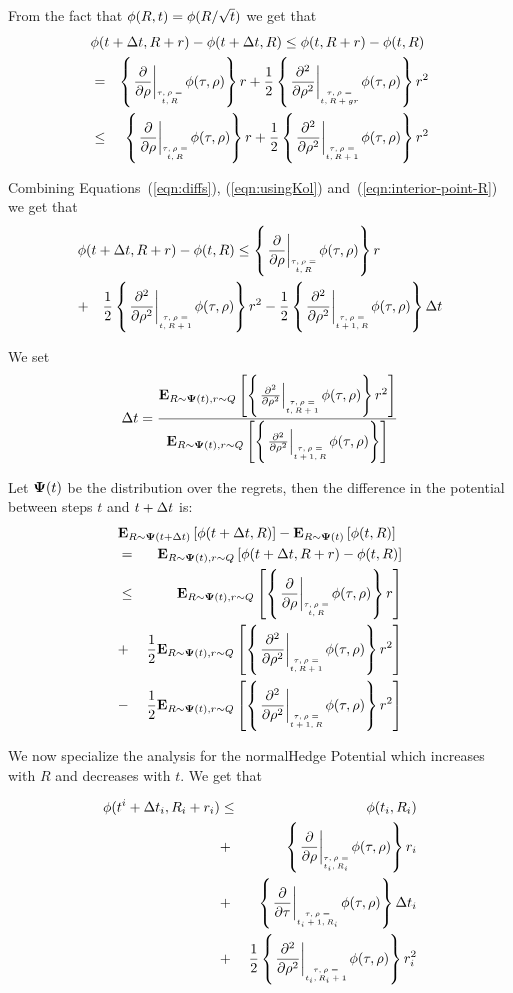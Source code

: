 \documentclass{article}[12pt]
\begin{document}
{From the fact that $\phi(R,t) = \phi(R/\sqrt{t})$ we get that 
\begin{eqnarray}
  \lefteqn{\pot(t+\deltat,\R+r)-\pot(t+\deltat,\R)
  \leq \pot(t,\R+r)-\pot(t,\R)}&&\\
  &=&\at{\frac{\partial}{\partial \rho}}{t,R} r
  +\frac{1}{2} \at{\frac{\partial^2}{\partial \rho^2}}{t,R+g r} r^2
  \nonumber \\
  &\leq& \at{\frac{\partial}{\partial \rho}}{t,R} r
  +\frac{1}{2} \at{\frac{\partial^2}{\partial \rho^2}}{t,R+1} r^2
  \label{eqn:interior-point-R}
\end{eqnarray}

Combining Equations~(\ref{eqn:diffs}), (\ref{eqn:usingKol}) and~(\ref{eqn:interior-point-R}) we get that
\begin{eqnarray} 
  \lefteqn{\pot(t+\deltat,\R+r) - \pot(t,\R)
   \leq  \at{\frac{\partial}{\partial \rho}}{t,R} r} &&\\
   &+&   \frac{1}{2} \at{\frac{\partial^2}{\partial \rho^2}}{t,R+1} r^2
   - \frac{1}{2} \at{\frac{\partial^2}{\partial \rho^2}}{t+1,R} \deltat
\end{eqnarray}

 We set
 \[
   \deltat  = \frac{\E{R \sim \state(t), r \sim Q}{\at{\frac{\partial^2}{\partial \rho^2}}{t,R+1}r^2}}
   {\E{R \sim \state(t), r \sim Q}{\at{\frac{\partial^2}{\partial \rho^2}}{t+1,R}}}
 \]

Let ${\bf \Psi}(t)$ be the distribution over the regrets, then the difference in the potential between steps $t$ and $t+\Delta t$ is:
\begin{eqnarray}
  \lefteqn{\E{\R \sim \state(t+\deltat)}{\pot(t+\deltat,\R)} -
  \E{\R \sim \state(t)}{\pot(t,\R)} }
  &&\\
  &=&
      \E{R \sim \state(t), r \sim Q}{\pot(t+\deltat,R+r) - \pot(t,\R)} \\
  &\leq&
         \E{R \sim \state(t), r \sim Q}
         {\at{\frac{\partial}{\partial \rho}}{t,R} r}\\
  &+&
      \frac{1}{2}\E{R \sim \state(t), r \sim Q}
      {\at{\frac{\partial^2}{\partial \rho^2}}{t,R+1} r^2}\\
  &-&
      \frac{1}{2} \E{R \sim \state(t), r \sim Q}{\at{\frac{\partial^2}{\partial \rho^2}}{t+1,R}r^2}
\end{eqnarray}


\iffalse
We now specialize the analysis for the normalHedge Potential which increases with $R$ and decreases with $t$. We get that 

\begin{eqnarray} 
  \pot(t^i+\deltat_i,\R_i+r_i) &\leq& \pot(t_i,\R_i) \\
  &+&\at{\frac{\partial}{\partial \rho}}{t_i,R_i} r_i \\
  &+&\at{\frac{\partial}{\partial \tau}}{t_i+1,R_i}  \deltat_i \\
  &+& \frac{1}{2} \at{\frac{\partial^2}{\partial \rho^2}}{t_i,R_i+1} r_i^2 \\
\end{eqnarray}


}
\end{document}
